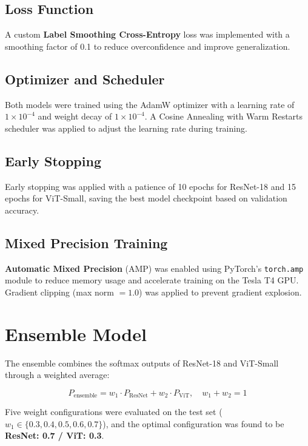 \documentclass[12pt]{report}
\begin{document}
\subsection{Loss Function}
A custom \textbf{Label Smoothing Cross-Entropy} loss was implemented with a
smoothing factor of 0.1 to reduce overconfidence and improve
generalization.

\subsection{Optimizer and Scheduler}
Both models were trained using the AdamW optimizer with a learning rate
of $1 \times 10^{-4}$ and weight decay of $1 \times 10^{-4}$. A Cosine
Annealing with Warm Restarts scheduler was applied to adjust the learning
rate during training.

\subsection{Early Stopping}
Early stopping was applied with a patience of 10 epochs for ResNet-18
and 15 epochs for ViT-Small, saving the best model checkpoint based on
validation accuracy.

\subsection{Mixed Precision Training}
\textbf{Automatic Mixed Precision} (AMP) was enabled using PyTorch's
\texttt{torch.amp} module to reduce memory usage and accelerate training
on the Tesla T4 GPU. Gradient clipping (max norm $= 1.0$) was applied
to prevent gradient explosion.

\section{Ensemble Model}

The ensemble combines the softmax outputs of ResNet-18 and ViT-Small
through a weighted average:

\begin{equation}
    P_{\text{ensemble}} = w_1 \cdot P_{\text{ResNet}} +
    w_2 \cdot P_{\text{ViT}}, \quad w_1 + w_2 = 1
\end{equation}

Five weight configurations were evaluated on the test set
($w_1 \in \{0.3, 0.4, 0.5, 0.6, 0.7\}$), and the optimal configuration
was found to be \textbf{ResNet: 0.7 / ViT: 0.3}.
\end{document}
